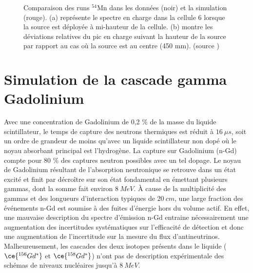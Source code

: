 {\begin{figure}[h!]
\caption[Comparaison des runs ${}^{54}\textrm{Mn}$ entre les données et la simulation]{Comparaison des runs ${}^{54}\textrm{Mn}$ dans les données (noir) et la simulation (rouge). (a) représente le spectre en charge dans la cellule 6 lorsque la source est déployée à mi-hauteur de la cellule. (b) montre les déviations relatives du pic en charge suivant la hauteur de la source par rapport au cas où la source est au centre (450 mm). (source \cite{Allemandou:2018vwb})}
\label{fig:MC_tuning_optics}
\end{figure}

}

\bigbreak




\section{Simulation de la cascade gamma Gadolinium}
\label{sec:cascade_Gd_MC}

Avec une concentration de Gadolinium de 0,2 \% de la masse du liquide scintillateur, le temps de capture des neutrons thermiques est réduit à $\SI{16}{\mu s}$, soit un ordre de grandeur de moins qu'avec un liquide scintillateur non dopé où le noyau absorbant principal est l'hydrogène. La capture sur Gadolinium (n-Gd) compte pour 80 \% des captures neutron possibles avec un tel dopage. Le noyau de Gadolinium résultant de l'absorption neutronique se retrouve dans un état excité et finit par décroître sur son état fondamental en émettant plusieurs gammas, dont la somme fait environ $\SI{8}{MeV}$. À cause de la multiplicité des gammas et des longueurs d'interaction typiques de $\SI{20}{cm}$, une large fraction des événements n-Gd est soumise à des fuites d'énergie hors du volume actif. En effet, une mauvaise description du spectre d'émission n-Gd entraine nécessairement une augmentation des incertitudes systématiques sur l'efficacité de détection et donc une augmentation de l'incertitude sur la mesure du flux d'antineutrinos. Malheureusement, les cascades des deux isotopes présents dans le liquide ($\ce{^{156}Gd^*}$ et $\ce{^{158}Gd^*}$) n'ont pas de description expérimentale des schémas de niveaux nucléaires jusqu'à $\SI{8}{MeV}$.\\

